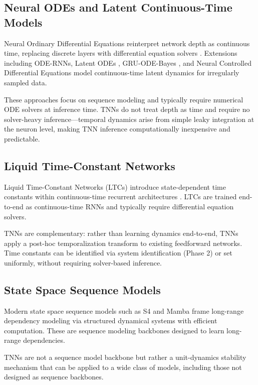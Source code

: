 \documentclass[11pt]{article}
\begin{document}
\subsection{Neural ODEs and Latent Continuous-Time Models}

Neural Ordinary Differential Equations reinterpret network depth as continuous time, replacing discrete layers with differential equation solvers \citep{chen2018neural}. Extensions including ODE-RNNs, Latent ODEs \citep{rubanova2019latentode}, GRU-ODE-Bayes \citep{debrouwer2019gruode}, and Neural Controlled Differential Equations \citep{kidger2020neuralcde} model continuous-time latent dynamics for irregularly sampled data.

These approaches focus on sequence modeling and typically require numerical ODE solvers at inference time. TNNs do not treat depth as time and require no solver-heavy inference---temporal dynamics arise from simple leaky integration at the neuron level, making TNN inference computationally inexpensive and predictable.

\subsection{Liquid Time-Constant Networks}

Liquid Time-Constant Networks (LTCs) introduce state-dependent time constants within continuous-time recurrent architectures \citep{hasani2022closed}. LTCs are trained end-to-end as continuous-time RNNs and typically require differential equation solvers.

TNNs are complementary: rather than learning dynamics end-to-end, TNNs apply a post-hoc temporalization transform to existing feedforward networks. Time constants can be identified via system identification (Phase 2) or set uniformly, without requiring solver-based inference.

\subsection{State Space Sequence Models}

Modern state space sequence models such as S4 \citep{gu2022s4} and Mamba \citep{gu2023mamba} frame long-range dependency modeling via structured dynamical systems with efficient computation. These are sequence modeling backbones designed to learn long-range dependencies.

TNNs are not a sequence model backbone but rather a unit-dynamics stability mechanism that can be applied to a wide class of models, including those not designed as sequence backbones.
\end{document}
